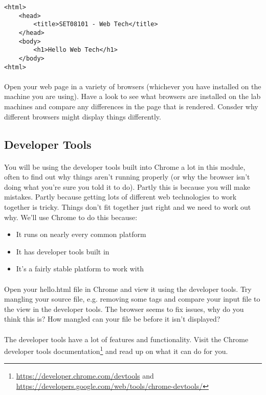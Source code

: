 \documentclass[10pt, a4paper]{article}
\begin{document}
\begin{lstlisting}
<html>
    <head>
        <title>SET08101 - Web Tech</title>
    </head>
    <body>
        <h1>Hello Web Tech</h1>
    </body>
<html>
\end{lstlisting}

\paragraph{} Open your web page in a variety of browsers (whichever you have installed on the machine you are using). Have a look to see what browsers are installed on the lab machines and compare any differences in the page that is rendered. Consder why different browsers might display things differently.

\subsection{Developer Tools}
\paragraph{} You will be using the developer tools built into Chrome a lot in this module, often to find out why things aren't running properly (or why the browser isn't doing what you're sure you told it to do). Partly this is because you will make mistakes. Partly because getting lots of different web technologies to work together is tricky. Things don't fit together just right and we need to work out why. We'll use Chrome to do this because:

\begin{itemize}
\item It runs on nearly every common platform
\item It has developer tools built in
\item It's a fairly stable platform to work with
\end{itemize}

\paragraph{} Open your hello.html file in Chrome and view it using the developer tools. Try mangling your source file, e.g. removing some tags and compare your input file to the view in the developer tools. The browser seems to fix issues, why do you think this is? How mangled can your file be before it isn't displayed? 

\paragraph{} The developer tools have a lot of features and functionality. Visit the Chrome developer tools documentation\footnote{\url{https://developer.chrome.com/devtools} and \url{https://developers.google.com/web/tools/chrome-devtools/}} and read up on what it can do for you.
\end{document}

